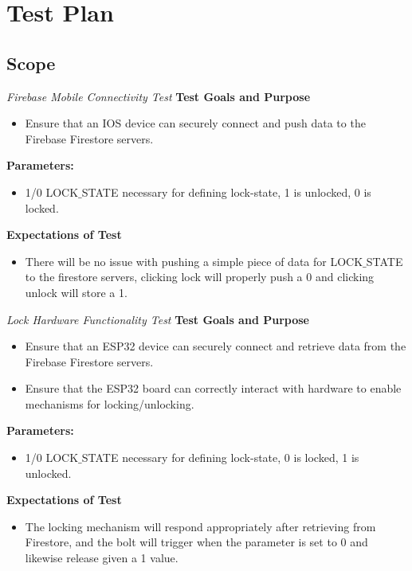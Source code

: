 \section{Test Plan}

\subsection{Scope}
\Large
\textit{Firebase Mobile Connectivity Test}
\newline
\newline
\normalsize
\textbf{Test Goals and Purpose} 
\begin{itemize}
    \item Ensure that an IOS device can securely connect and push data to the Firebase Firestore servers.

\end{itemize}
\textbf{Parameters:}
\begin{itemize}

\item 1/0 LOCK$\_$STATE necessary for defining lock-state, 1 is unlocked, 0 is locked.

\end{itemize}
\textbf{Expectations of Test}
\begin{itemize}

\item There will be no issue with pushing a simple piece of data for LOCK$\_$STATE to the firestore servers, clicking lock will properly push a 0 and clicking unlock will store a 1.

\end{itemize}
\Large
\textit{Lock Hardware Functionality Test}
\newline
\newline
\normalsize
\textbf{Test Goals and Purpose}
\begin{itemize}
    \item Ensure that an ESP32 device can securely connect and retrieve data from the Firebase Firestore servers.
    \item Ensure that the ESP32 board can correctly interact with hardware to enable mechanisms for locking/unlocking.
\end{itemize}
\textbf{Parameters:}
\begin{itemize}

\item 1/0 LOCK$\_$STATE necessary for defining lock-state, 0 is locked, 1 is unlocked.

\end{itemize}
\textbf{Expectations of Test}
\begin{itemize}

\item The locking mechanism will respond appropriately after retrieving from Firestore, and the bolt will trigger when the parameter is set to 0 and likewise release given a 1 value.

\end{itemize}
